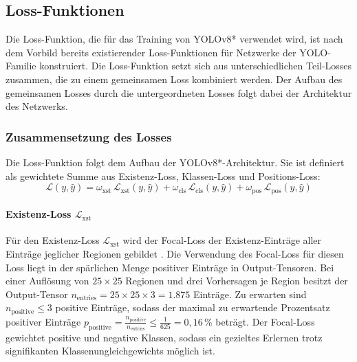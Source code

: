 
\vspace*{-0.2cm}
\subsection{Loss-Funktionen}
\label{sec:losses}

Die Loss-Funktion, die für das Training von YOLOv8* verwendet wird, ist nach dem Vorbild bereits existierender Loss-Funktionen für Netzwerke der YOLO-Familie konstruiert. Die Loss-Funktion setzt sich aus unterschiedlichen Teil-Losses zusammen, die zu einem gemeinsamen Loss kombiniert werden. Der Aufbau des gemeinsamen Losses durch die untergeordneten Losses folgt dabei der Architektur des Netzwerks.

\vspace*{-0.1cm}
\subsubsection{Zusammensetzung des Losses}

Die Loss-Funktion folgt dem Aufbau der YOLOv8*-Architektur. Sie ist definiert als gewichtete Summe aus Existenz-Loss, Klassen-Loss und Positions-Loss:
\[ \mathcal{L}(y, \hat{y}) = \omega_\text{xst}\,\mathcal{L}_\text{xst}(y, \hat{y}) + \omega_\text{cls}\,\mathcal{L}_\text{cls}(y, \hat{y}) + \omega_\text{pos}\,\mathcal{L}_\text{pos}(y, \hat{y}) \]

\vspace*{-0.4cm}
\paragraph{Existenz-Loss $\mathcal{L}_\text{xst}$}

Für den Existenz-Loss $\mathcal{L}_\text{xst}$ wird der Focal-Loss der Existenz-Einträge aller Einträge jeglicher Regionen gebildet \cite{focal_loss}. Die Verwendung des Focal-Loss für diesen Loss liegt in der spärlichen Menge positiver Einträge in Output-Tensoren. Bei einer Auflösung von $25 \times 25$ Regionen und drei Vorhersagen je Region besitzt der Output-Tensor $n_\text{entries} = 25 \times 25 \times 3 = 1.875$ Einträge. Zu erwarten sind $ n_\text{positive} \leq 3 $ positive Einträge, sodass der maximal zu erwartende Prozentsatz positiver Einträge $p_\text{positive} = \frac{n_\text{positive}}{n_\text{entries}} \leq \frac{1}{625} = 0,\!16\,\%$ beträgt. Der Focal-Loss gewichtet positive und negative Klassen, sodass ein gezieltes Erlernen trotz signifikanten Klassenungleichgewichts möglich ist.

